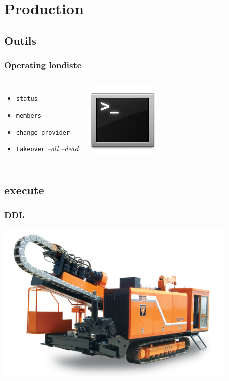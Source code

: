 \documentclass{beamer}
\begin{document}
\section{Production}
\subsection{Outils}

\begin{frame}[fragile]
  \frametitle{Operating londiste}

  \vfill

\begin{columns}[c]

  \begin{itemize}
    \item \texttt{status}
    \item \texttt{members}
    \item \texttt{change-provider}
    \item \texttt{takeover} \textit{--all} \textit{--dead}
  \end{itemize}

\begin{center}
  \includegraphics[height=1.4in]{TerminalIcon.png}
\end{center}
\end{columns}
\end{frame}

\subsection{execute}

\begin{frame}[fragile]
  \frametitle{DDL}

  \begin{center}
    \includegraphics[height=21em]
                    {Horizontal-Directional-Drilling-Rig-DDL-800-.jpg}
  \end{center}
\end{frame}
\end{document}
